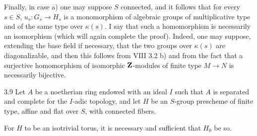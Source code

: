 Finally, in case a) one may suppose $S$ connected, and it follows that for every $s\in S$, $u_s:G_s\to H_s$ is a monomorphism of algebraic groups of multiplicative type and of the same type over $\kappa(s)$. I say that such a homomorphism is necessarily an isomorphism (which will again complete the proof). Indeed, one may suppose, extending the base field if necessary, that the two groups over $\kappa(s)$ are diagonalizable, and then this follows from VIII 3.2 b) and from the fact that a surjective homomorphism of isomorphic $\mathbf{Z}$-modules of finite type $M\to N$ is necessarily bijective.
\begin{corollary}{3.9}\label{X.3.9}
Let $A$ be a noetherian ring endowed with an ideal $I$ such that $A$ is separated and complete for the $I$-adic topology, and let $H$ be an $S$-group prescheme of finite type, affine and flat over $S$, with connected fibers.

For $H$ to be an isotrivial torus, it is necessary and sufficient that $H_0$ be so.
\end{corollary}
